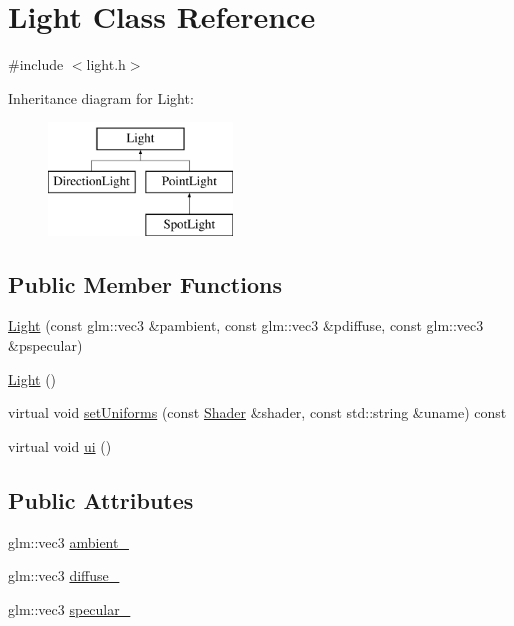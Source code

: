 \hypertarget{classLight}{}\section{Light Class Reference}
\label{classLight}


{\ttfamily \#include $<$light.\+h$>$}

Inheritance diagram for Light\+:\begin{figure}[H]
\begin{center}
\leavevmode
\includegraphics[height=3.000000cm]{classLight}
\end{center}
\end{figure}
\subsection*{Public Member Functions}
\begin{DoxyCompactItemize}
\item 
\hyperlink{classLight_aa563bb3ddf329e69f3026aafe309bb70}{Light} (const glm\+::vec3 \&pambient, const glm\+::vec3 \&pdiffuse, const glm\+::vec3 \&pspecular)
\item 
\hyperlink{classLight_aeb5df09a25a32f19fdffa761268ba24f}{Light} ()
\item 
virtual void \hyperlink{classLight_adfffa53d21bbeaa638c0bc5ae5a852cc}{set\+Uniforms} (const \hyperlink{classShader}{Shader} \&shader, const std\+::string \&uname) const
\item 
virtual void \hyperlink{classLight_a15770d3a4b173cd517477dfb5d5bcab9}{ui} ()
\end{DoxyCompactItemize}
\subsection*{Public Attributes}
\begin{DoxyCompactItemize}
\item 
glm\+::vec3 \hyperlink{classLight_ad255e60575bdb0ca5e9e63b738877327}{ambient\+\_\+}
\item 
glm\+::vec3 \hyperlink{classLight_ac5934c40340eb38365a9c090473c884f}{diffuse\+\_\+}
\item 
glm\+::vec3 \hyperlink{classLight_a9b425b4f0b04ec90da7de4bf77f30d1c}{specular\+\_\+}
\end{DoxyCompactItemize}


